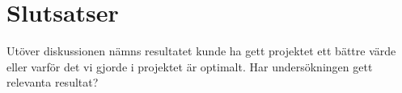\section{Slutsatser}
\label{sec:tim-conclusion}
Utöver diskussionen nämns resultatet kunde ha gett projektet ett bättre värde eller varför det vi gjorde i projektet är optimalt. Har undersökningen gett relevanta resultat?

